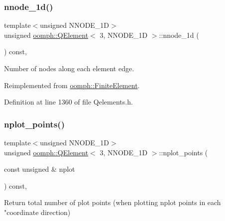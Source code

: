 \subsubsection{\texorpdfstring{nnode\+\_\+1d()}{nnode\_1d()}}
{\footnotesize\ttfamily template$<$unsigned N\+N\+O\+D\+E\+\_\+1D$>$ \\
unsigned \hyperlink{classoomph_1_1QElement}{oomph\+::\+Q\+Element}$<$ 3, N\+N\+O\+D\+E\+\_\+1D $>$\+::nnode\+\_\+1d (\begin{DoxyParamCaption}{ }\end{DoxyParamCaption}) const\hspace{0.3cm}{\ttfamily [inline]}, {\ttfamily [virtual]}}



Number of nodes along each element edge. 



Reimplemented from \hyperlink{classoomph_1_1FiniteElement_ab65c7a94dda80c1876a09ac12be4e39c}{oomph\+::\+Finite\+Element}.



Definition at line 1360 of file Qelements.\+h.

\mbox{\label{classoomph_1_1QElement_3_013_00_01NNODE__1D_01_4_a00c72c9e208bc8db3cd2203d65b30a60}} 
\subsubsection{\texorpdfstring{nplot\+\_\+points()}{nplot\_points()}}
{\footnotesize\ttfamily template$<$unsigned N\+N\+O\+D\+E\+\_\+1D$>$ \\
unsigned \hyperlink{classoomph_1_1QElement}{oomph\+::\+Q\+Element}$<$ 3, N\+N\+O\+D\+E\+\_\+1D $>$\+::nplot\+\_\+points (\begin{DoxyParamCaption}\item[{const unsigned \&}]{nplot }\end{DoxyParamCaption}) const\hspace{0.3cm}{\ttfamily [inline]}, {\ttfamily [virtual]}}

Return total number of plot points (when plotting nplot points in each "coordinate direction) 

